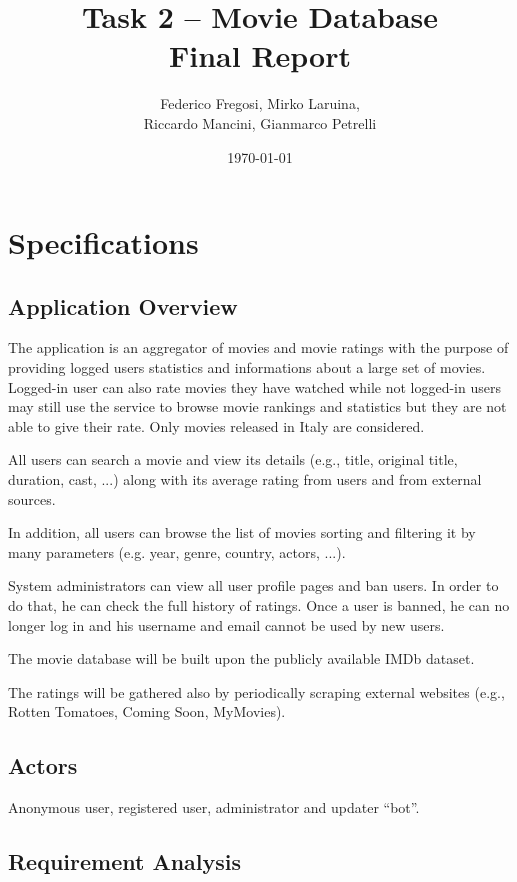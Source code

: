 \documentclass[11pt]{article}
\title{Task 2 -- Movie Database\\ 
	\Large Final Report}
\date{\today}
\author{Federico Fregosi, Mirko Laruina,\\
        Riccardo Mancini, Gianmarco Petrelli}
\begin{document}
\maketitle
\vfill
\setcounter{tocdepth}{2}
\tableofcontents
\vfill
\clearpage
\setcounter{page}{1}

\section{Specifications}

\subsection{Application Overview}
The application is an aggregator of movies and movie ratings with the purpose 
of providing logged users statistics and informations about a large set of movies.
Logged-in user can also rate movies they have watched while not logged-in users 
may still use the service to browse movie rankings and statistics but they are not
able to give their rate. Only movies released in Italy are considered.

All users can search a movie and view its details (e.g., title, original title, duration, 
cast, ...) along with its average rating from users and from external sources. 

In addition, all users can browse the list of movies sorting and filtering it by many parameters
(e.g. year, genre, country, actors, ...).

System administrators can view all user profile pages and ban users. In order to do that, he can 
check the full history of ratings. Once a user is banned, he can no longer log in and his username and email cannot be used by new users.

The movie database will be built upon the publicly available IMDb dataset.

The ratings will be gathered also by periodically scraping external websites 
(e.g., Rotten Tomatoes, Coming Soon, MyMovies).

\subsection{Actors}
Anonymous user, registered user, administrator and updater ``bot''.

\subsection{Requirement Analysis}
\end{document}

